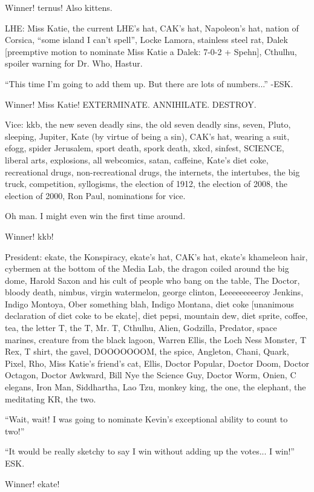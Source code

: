 \documentclass[10pt]{article}
\begin{document}
Winner! ternus!  Also kittens.

LHE: Miss Katie, the current LHE's hat, CAK's hat, Napoleon's hat, nation of Corsica, ``some island I can't spell'', Locke Lamora, stainless steel rat, Dalek [preemptive motion to nominate Miss Katie a Dalek: 7-0-2 + Spehn], Cthulhu, spoiler warning for Dr. Who, Hastur.

``This time I'm going to add them up.  But there are lots of numbers...'' -ESK.

Winner! Miss Katie!  EXTERMINATE.  ANNIHILATE.  DESTROY.

Vice: kkb, the new seven deadly sins, the old seven deadly sins, seven, Pluto, sleeping, Jupiter, Kate (by virtue of being a sin), CAK's hat, wearing a suit, efogg, spider Jerusalem, sport death, spork death, xkcd, sinfest, SCIENCE, liberal arts, explosions, all webcomics, satan, caffeine, Kate's diet coke, recreational drugs, non-recreational drugs, the internets, the intertubes, the big truck, competition, syllogisms, the election of 1912, the election of 2008, the election of 2000, Ron Paul, nominations for vice.

Oh man.  I might even win the first time around.

Winner! kkb!

President: ekate, the Konspiracy, ekate's hat, CAK's hat, ekate's khameleon hair, cybermen at the bottom of the Media Lab, the dragon coiled around the big dome, Harold Saxon and his cult of people who bang on the table, The Doctor, bloody death, nimbus, virgin watermelon, george clinton, Leeeeeeeeeroy Jenkins, Indigo Montoya, Ober something blah, Indigo Montana, diet coke [unanimous declaration of diet coke to be ekate], diet pepsi, mountain dew, diet sprite, coffee, tea, the letter T, the T, Mr. T, Cthulhu, Alien, Godzilla, Predator, space marines, creature from the black lagoon, Warren Ellis, the Loch Ness Monster, T Rex, T shirt, the gavel, DOOOOOOOM, the spice, Angleton, Chani, Quark, Pixel, Rho, Miss Katie's friend's cat, Ellis, Doctor Popular, Doctor Doom, Doctor Octagon, Doctor Awkward, Bill Nye the Science Guy, Doctor Worm, Onien, C elegans, Iron Man, Siddhartha, Lao Tzu, monkey king, the one, the elephant, the meditating KR, the two.

``Wait, wait!  I was going to nominate Kevin's exceptional ability to count to two!''

``It would be really sketchy to say I win without adding up the votes... I win!'' ESK.

Winner! ekate!
\end{document}
